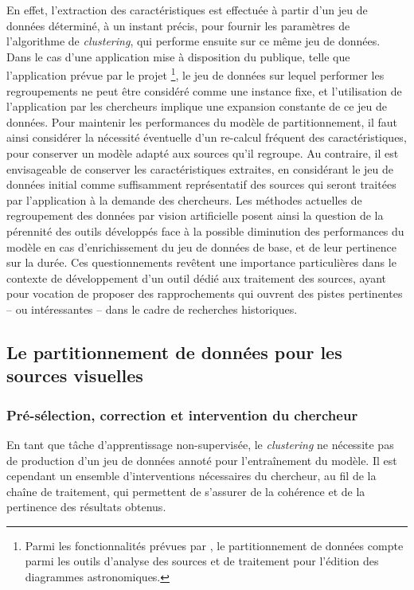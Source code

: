     En effet, l'extraction des caractéristiques est effectuée à partir d'un jeu de données déterminé, à un instant précis, pour fournir les paramètres de l'algorithme de \textit{clustering}, qui performe ensuite sur ce même jeu de données. Dans le cas d'une application mise à disposition du publique, telle que l'application prévue par le projet \eida\footnote{Parmi les fonctionnalités prévues par \eida, le partitionnement de données compte parmi les outils d'analyse des sources et de traitement pour l'édition des diagrammes astronomiques.}, le jeu de données sur lequel performer les regroupements ne peut être considéré comme une instance fixe, et l'utilisation de l'application par les chercheurs implique une expansion constante de ce jeu de données. Pour maintenir les performances du modèle de partitionnement, il faut ainsi considérer la nécessité éventuelle d'un re-calcul fréquent des caractéristiques, pour conserver un modèle adapté aux sources qu'il regroupe. Au contraire, il est envisageable de conserver les caractéristiques extraites, en considérant le jeu de données initial comme suffisamment représentatif des sources qui seront traitées par l'application à la demande des chercheurs. Les méthodes actuelles de regroupement des données par vision artificielle posent ainsi la question de la pérennité des outils développés face à la possible diminution des performances du modèle en cas d'enrichissement du jeu de données de base, et de leur pertinence sur la durée. Ces questionnements revêtent une importance particulières dans le contexte de développement d'un outil dédié aux traitement des sources, ayant pour vocation de proposer des rapprochements qui ouvrent des pistes pertinentes -- ou intéressantes -- dans le cadre de recherches historiques.
    
\subsection{Le partitionnement de données pour les sources visuelles}
    \subsubsection{Pré-sélection, correction et intervention du chercheur}
    En tant que tâche d'apprentissage non-supervisée, le \textit{clustering} ne nécessite pas de production d'un jeu de données annoté pour l'entraînement du modèle. Il est cependant un ensemble d'interventions nécessaires du chercheur, au fil de la chaîne de traitement, qui permettent de s'assurer de la cohérence et de la pertinence des résultats obtenus.
    
